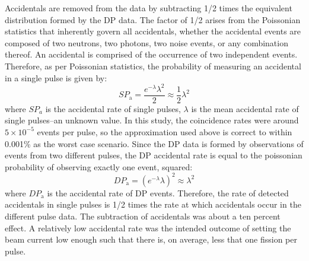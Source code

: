Accidentals are removed from the data by subtracting 1/2 times the equivalent distribution formed by the DP data.
The factor of 1/2 arises from the Poissonian statistics that inherently govern all accidentals, whether the accidental events are composed of two neutrons, two photons, two noise events, or any combination thereof.
An accidental is comprised of the occurrence of two independent events.
Therefore, as per Poissonian statistics, the probability of measuring an accidental in a single pulse is given by:
\begin{displaymath}
SP_{\text{a}} = \frac{e^{-\lambda}\lambda^2}{2} \approx \frac{1}{2}\lambda^{2}
\end{displaymath}
where $SP_{a}$ is the accidental rate of single pulses, $\lambda$ is the mean accidental rate of single pulses–an unknown value.
In this study, the coincidence rates were around $5\times10^{-5}$ events per pulse, so the approximation used above is correct to within 0.001\% as the worst case scenario.
Since the DP data is formed by observations of events from two different pulses, the DP accidental rate is equal to the poissonian probability of observing exactly one event, squared:
\begin{displaymath}
DP_{\text{a}} = (e^{-\lambda}\lambda)^{2}\approx \lambda^{2} 
\end{displaymath}
where $DP_{\text{a}}$ is the accidental rate of DP events.
Therefore, the rate of detected accidentals in single pulses is 1/2 times the rate at which accidentals occur in the different pulse data.
The subtraction of accidentals was about a ten percent effect.
A relatively low accidental rate was the intended outcome of setting the beam current low enough such that there is, on average, less that one fission per pulse.
